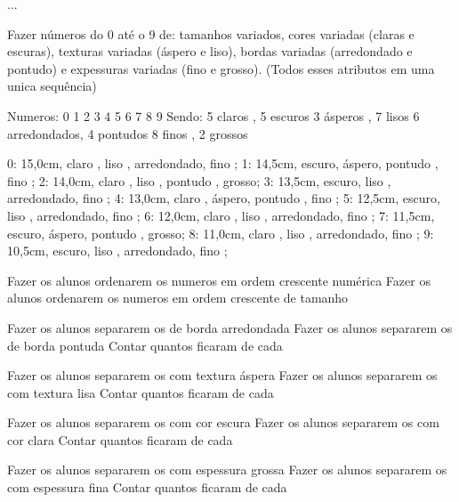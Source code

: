 \documentclass{SchoolBook}
\begin{document}
    \begin{day}{...}
        
    
        Fazer números do 0 até o 9 de: tamanhos variados, cores variadas (claras e escuras), texturas variadas (áspero e liso), bordas variadas (arredondado e pontudo) e expessuras variadas (fino e grosso).
        (Todos esses atributos em uma unica sequência)
        
        Numeros: 0 1 2 3 4 5 6 7 8 9
        Sendo:
            5 claros      , 5 escuros
            3 ásperos     , 7 lisos
            6 arredondados, 4 pontudos
            8 finos       , 2 grossos
            
            0: 15,0cm, claro , liso  , arredondado, fino  ;
            1: 14,5cm, escuro, áspero, pontudo    , fino  ;
            2: 14,0cm, claro , liso  , pontudo    , grosso;
            3: 13,5cm, escuro, liso  , arredondado, fino  ;
            4: 13,0cm, claro , áspero, pontudo    , fino  ;
            5: 12,5cm, escuro, liso  , arredondado, fino  ;
            6: 12,0cm, claro , liso  , arredondado, fino  ;
            7: 11,5cm, escuro, áspero, pontudo    , grosso;
            8: 11,0cm, claro , liso  , arredondado, fino  ;
            9: 10,5cm, escuro, liso  , arredondado, fino  ;
            
        Fazer os alunos ordenarem os numeros em ordem crescente numérica
        Fazer os alunos ordenarem os numeros em ordem crescente de tamanho
        
        Fazer os alunos separarem os de borda arredondada
        Fazer os alunos separarem os de borda pontuda
        Contar quantos ficaram de cada
        
        Fazer os alunos separarem os com textura áspera
        Fazer os alunos separarem os com textura lisa
        Contar quantos ficaram de cada
        
        Fazer os alunos separarem os com cor escura
        Fazer os alunos separarem os com cor clara
        Contar quantos ficaram de cada
        
        Fazer os alunos separarem os com espessura grossa
        Fazer os alunos separarem os com espessura fina
        Contar quantos ficaram de cada
        
    \end{day}
\end{document}
